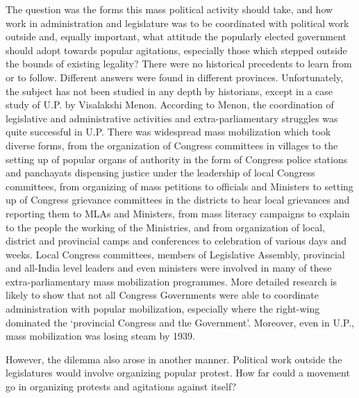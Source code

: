 \begin{multicols}{2}
The question was the forms this mass political activity should take, and how work in administration and legislature was to be coordinated with political work outside and, equally important, what attitude the popularly elected government should adopt towards popular agitations, especially those which stepped outside the bounds of existing legality? There were no historical precedents to learn from or to follow. Different answers were found in different provinces. Unfortunately, the subject has not been studied in any depth by historians, except in a case study of U.P. by Visalakshi Menon. According to Menon, the coordination of legislative and administrative activities and extra-parliamentary struggles was quite successful in U.P. There was widespread mass mobilization which took diverse forms, from the organization of Congress committees in villages to the setting up of popular organs of authority in the form of Congress police stations and panchayats dispensing justice under the leadership of local Congress committees, from organizing of mass petitions to officials and Ministers to setting up of Congress grievance committees in the districts to hear local grievances and reporting them to MLAs and Ministers, from mass literacy campaigns to explain to the people the working of the Ministries, and from organization of local, district and provincial camps and conferences to celebration of various days and weeks. Local Congress committees, members of Legislative Assembly, provincial and all-India level leaders and even ministers were involved in many of these extra-parliamentary mass mobilization programmes. More detailed research is likely to show that not all Congress Governments were able to coordinate administration with popular mobilization, especially where the right-wing dominated the `provincial Congress and the Government'. Moreover, even in U.P., mass mobilization was losing steam by 1939.

However, the dilemma also arose in another manner. Political work outside the legislatures would involve organizing popular protest. How far could a movement go in organizing protests and agitations against itself?


\end{multicols}
